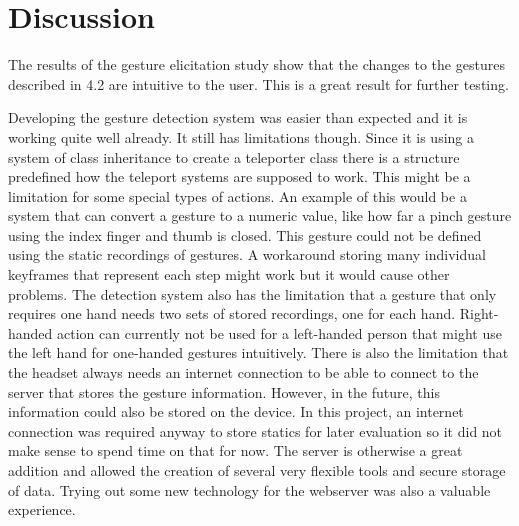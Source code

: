 \chapter{Discussion}

The results of the gesture elicitation study show that the changes to the gestures described in 4.2 are intuitive to the user. %
This is a great result for further testing.


Developing the gesture detection system was easier than expected and it is working quite well already. It still has limitations though. Since it is using a system of class inheritance to create a teleporter class there is a structure predefined how the teleport systems are supposed to work. This might be a limitation for some special types of actions. An example of this would be a system that can convert a gesture to a numeric value, like how far a pinch gesture using the index finger and thumb is closed. This gesture could not be defined using the static recordings of gestures. A workaround storing many individual keyframes that represent each step might work but it would cause other problems. The detection system also has the limitation that a gesture that only requires one hand needs two sets of stored recordings, one for each hand. Right-handed action can currently not be used for a left-handed person that might use the left hand for one-handed gestures intuitively. There is also the limitation that the headset always needs an internet connection to be able to connect to the server that stores the gesture information. However, in the future, this information could also be stored on the device. In this project, an internet connection was required anyway to store statics for later evaluation so it did not make sense to spend time on that for now. The server is otherwise a great addition and allowed the creation of several very flexible tools and secure storage of data. Trying out some new technology for the webserver was also a valuable experience. 